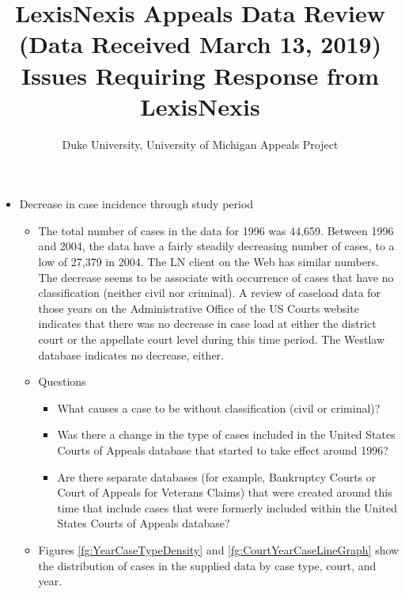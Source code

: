 \documentclass[10pt, letterpaper]{article}
\title{\large LexisNexis Appeals Data Review (Data Received March 13, 2019)\\[10pt]Issues Requiring Response from LexisNexis\\[-6pt]}
\author{Duke University, University of Michigan Appeals Project}
\date{}
\begin{document}
    
\begin{spacing}{1.0}

\maketitle

\begin{itemize}
    
    \item  Decrease in case incidence through study period

    \begin{itemize}
    
        \item The total number of cases in the data for 1996 was 44,659. Between 1996 and 2004, the data have a fairly steadily decreasing number of cases, to a low of 27,379 in 2004. The LN client on the Web has similar numbers. The decrease seems to be associate with occurrence of cases that have no classification (neither civil nor criminal). A review of caseload data for those years on the Administrative Office of the US Courts website indicates that there was no decrease in case load at either the district court or the appellate court level during this time period. The Westlaw database indicates no decrease, either.
        
        \item Questions
        \begin{itemize}
            \item What causes a case to be without classification (civil or criminal)?
            \item Was there a change in the type of cases included in the United States Courts of Appeals database that started to take effect around 1996?
            \item Are there separate databases (for example, Bankruptcy Courts or Court of Appeals for Veterans Claims) that were created around this time that include cases that were formerly included within the United States Courts of Appeals database?
        \end{itemize}
        
        \item Figures \ref{fg:YearCaseTypeDensity} and \ref{fg:CourtYearCaseLineGraph} show the distribution of cases in the supplied data by case type, court, and year.
        
    \end{itemize}
    

\end{itemize}
\end{spacing}
\end{document}
